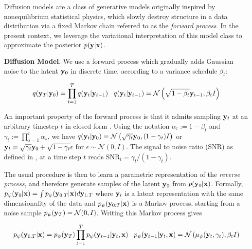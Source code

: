 Diffusion models \parencite{Ho2020,Song2021} are a class of generative models originally inspired by nonequilibrium statistical physics, which slowly destroy structure in a data distribution via a fixed Markov chain referred to as the \emph{forward process}. In the present context, we leverage the variational interpretation of this model class \parencite{Kingma2021,Kingma2023} to approximate the posterior $p(\bold{y}\lvert\bold{x})$. 

\textbf{Diffusion Model}. We use a forward process which gradually adds Gaussian noise to the latent $\bold{y}_0$ in discrete time, according to a variance schedule $\beta_{t}$:

\begin{equation}
q(\bold{y}_{T}\lvert\bold{y}_{0}) = \prod_{t=1}^{T}q(\bold{y}_{t}\lvert\bold{y}_{t-1}) \;\;\; q(\bold{y}_{t}\lvert\bold{y}_{t-1}) = \mathcal{N}\left(\sqrt{1-\beta_{t}}\bold{y}_{t-1},\beta_t I\right)
\end{equation}

An important property of the forward process is that it admits sampling $\bold{y}_t$ at an arbitrary timestep $t$ in closed form \parencite{Ho2020}. Using the notation $\alpha_t := 1 - \beta_t$ and $\gamma_t := \prod_{s=1}^{t} \alpha_s$, we have $q(\bold{y}_t\lvert\bold{y}_0) = \mathcal{N} \left(\sqrt{\gamma_{t}} \bold{y}_{0}, (1 - \gamma_t)I \right)$ or $\bold{y}_{t} = \sqrt{\gamma_{t}}\bold{y}_{0} + \sqrt{1-\gamma_{t}}\bold{\epsilon}$ for $\epsilon \sim \mathcal{N}(0,I)$. The signal to noise ratio (SNR) as defined in \parencite{Kingma2023}, at a time step $t$ reads $\mathrm{SNR}_t = \gamma_{t}/(1-\gamma_{t})$.

The usual procedure is then to learn a parametric representation of the \emph{reverse process}, and therefore generate samples of the latent $\bold{y}_{0}$ from  $p(\bold{y}_{0}\lvert\bold{x})$. Formally, $p_{\psi}(\bold{y}_{0}\lvert\bold{x}) = \int p_{\psi}(\bold{y}_{0:T}\lvert\bold{x})d\bold{y}_{1:T}$ where $\bold{y}_{t}$ is a latent representation with the same dimensionality of the data and $p_{\psi}(\bold{y}_{0:T}\lvert\bold{x})$ is a Markov process, starting from a noise sample $p_{\psi}(\bold{y}_{T}) = \mathcal{N}(0,I)$. Writing this Markov process gives

\begin{equation}
p_{\psi}(\bold{y}_{0:T}\lvert\bold{x}) = p_{\psi}(\bold{y}_{T})\prod_{t=1}^{T} p_{\psi}(\bold{y}_{t-1}\lvert\bold{y}_{t},\bold{x}) \;\;\; p_{\psi}(\bold{y}_{t-1}\lvert\bold{y}_{t},\bold{x}) = \mathcal{N}\left(\mu_{\psi}(\bold{y}_{t},\gamma_{t}),\beta_{t}I\right)
\end{equation}

